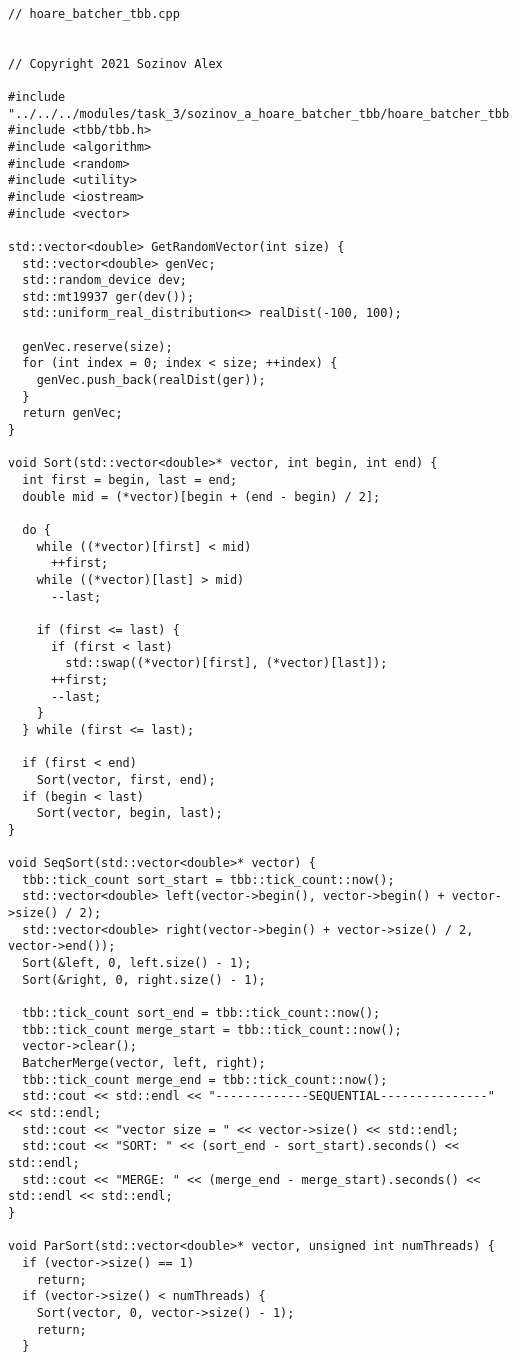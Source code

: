 \documentclass{report}
\begin{document}
\begin{lstlisting}

// hoare_batcher_tbb.cpp


// Copyright 2021 Sozinov Alex

#include "../../../modules/task_3/sozinov_a_hoare_batcher_tbb/hoare_batcher_tbb.h"
#include <tbb/tbb.h>
#include <algorithm>
#include <random>
#include <utility>
#include <iostream>
#include <vector>

std::vector<double> GetRandomVector(int size) {
  std::vector<double> genVec;
  std::random_device dev;
  std::mt19937 ger(dev());
  std::uniform_real_distribution<> realDist(-100, 100);

  genVec.reserve(size);
  for (int index = 0; index < size; ++index) {
    genVec.push_back(realDist(ger));
  }
  return genVec;
}

void Sort(std::vector<double>* vector, int begin, int end) {
  int first = begin, last = end;
  double mid = (*vector)[begin + (end - begin) / 2];

  do {
    while ((*vector)[first] < mid)
      ++first;
    while ((*vector)[last] > mid)
      --last;

    if (first <= last) {
      if (first < last)
        std::swap((*vector)[first], (*vector)[last]);
      ++first;
      --last;
    }
  } while (first <= last);

  if (first < end)
    Sort(vector, first, end);
  if (begin < last)
    Sort(vector, begin, last);
}

void SeqSort(std::vector<double>* vector) {
  tbb::tick_count sort_start = tbb::tick_count::now();
  std::vector<double> left(vector->begin(), vector->begin() + vector->size() / 2);
  std::vector<double> right(vector->begin() + vector->size() / 2, vector->end());
  Sort(&left, 0, left.size() - 1);
  Sort(&right, 0, right.size() - 1);

  tbb::tick_count sort_end = tbb::tick_count::now();
  tbb::tick_count merge_start = tbb::tick_count::now();
  vector->clear();
  BatcherMerge(vector, left, right);
  tbb::tick_count merge_end = tbb::tick_count::now();
  std::cout << std::endl << "-------------SEQUENTIAL---------------" << std::endl;
  std::cout << "vector size = " << vector->size() << std::endl;
  std::cout << "SORT: " << (sort_end - sort_start).seconds() << std::endl;
  std::cout << "MERGE: " << (merge_end - merge_start).seconds() << std::endl << std::endl;
}

void ParSort(std::vector<double>* vector, unsigned int numThreads) {
  if (vector->size() == 1)
    return;
  if (vector->size() < numThreads) {
    Sort(vector, 0, vector->size() - 1);
    return;
  }


\end{lstlisting}
\end{document}
